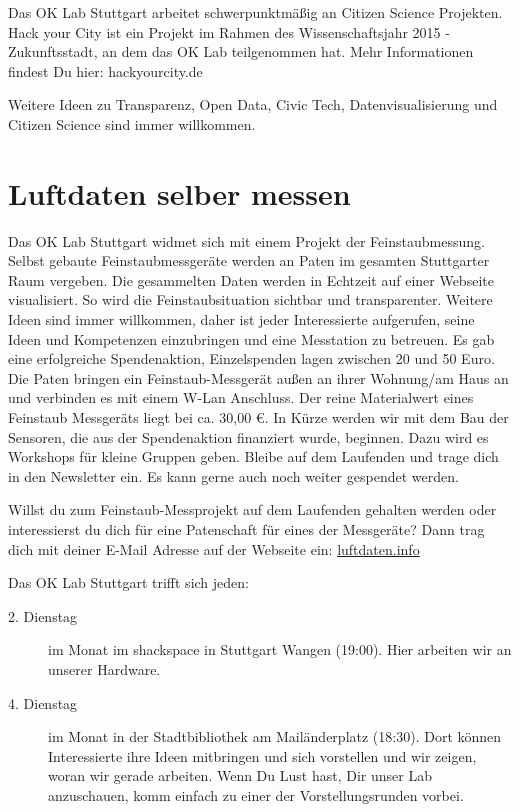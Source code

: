 \documentclass[
notumble,
]{leaflet}
\begin{document}
Das OK Lab Stuttgart arbeitet schwerpunktmäßig an Citizen Science Projekten. 
Hack your City ist ein Projekt im Rahmen des Wissenschaftsjahr 2015 - Zukunftsstadt, an dem das OK Lab teilgenommen hat. 
Mehr Informationen findest Du hier: hackyourcity.de

Weitere Ideen zu Transparenz, Open Data, Civic Tech, Datenvisualisierung und Citizen Science sind immer willkommen.



\section{Luftdaten selber messen}

Das OK Lab Stuttgart widmet sich mit einem Projekt der Feinstaubmessung. 
Selbst gebaute Feinstaubmessgeräte werden an Paten im gesamten Stuttgarter Raum vergeben. 
Die gesammelten Daten werden in Echtzeit auf einer Webseite visualisiert. 
So wird die Feinstaubsituation sichtbar und transparenter. 
Weitere Ideen sind immer willkommen, daher ist jeder Interessierte aufgerufen, seine Ideen und Kompetenzen einzubringen und eine Messtation zu betreuen.
Es gab eine erfolgreiche Spendenaktion, Einzelspenden lagen zwischen 20 und 50 Euro.
Die Paten bringen ein Feinstaub-Messgerät außen an ihrer Wohnung/am Haus an und verbinden es mit einem W-Lan Anschluss.
Der reine Materialwert eines Feinstaub Messgeräts liegt bei ca. 30,00 €. 
% 
In Kürze werden wir mit dem Bau der Sensoren, die aus der Spendenaktion finanziert wurde, beginnen. 
Dazu wird es Workshops für kleine Gruppen geben. Bleibe auf dem Laufenden und trage dich in den Newsletter ein.
Es kann gerne auch noch weiter gespendet werden.

Willst du zum Feinstaub-Messprojekt auf dem Laufenden gehalten werden oder interessierst du dich für eine Patenschaft für eines der Messgeräte?
Dann trag dich mit deiner E-Mail Adresse auf der Webseite ein:
\href{http://luftdaten.info/}{luftdaten.info}

Das OK Lab Stuttgart trifft sich jeden:
\begin{description}
 \item [2. Dienstag] im Monat im shackspace in Stuttgart Wangen (19:00). Hier arbeiten wir an unserer Hardware.
 \item [4. Dienstag] im Monat in der Stadtbibliothek am Mailänderplatz (18:30). 
	Dort können Interessierte ihre Ideen mitbringen und sich vorstellen und wir zeigen, woran wir gerade arbeiten. 
	Wenn Du Lust hast, Dir unser Lab anzuschauen, komm einfach zu einer der Vorstellungsrunden vorbei.
\end{description}
\end{document}
